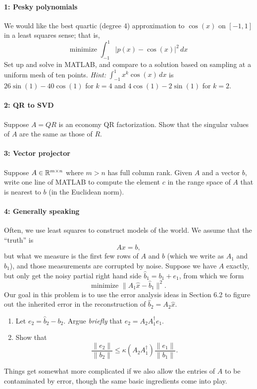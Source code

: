 \documentclass[12pt, leqno]{article}
\begin{document}

\paragraph*{1: Pesky polynomials}
We would like the best quartic (degree 4) approximation to $\cos(x)$
on $[-1,1]$ in a least squares sense; that is,
\[
  \mbox{minimize } \int_{-1}^1 |p(x)-\cos(x)|^2 \, dx
\]
Set up and solve in MATLAB, and compare to a solution based on
sampling at a uniform mesh of ten points.
{\em Hint:} $\int_{-1}^1 x^k \cos(x) \, dx$ is $26 \sin(1)-40 \cos(1)$
for $k = 4$ and $4 \cos(1) - 2 \sin(1)$ for $k = 2$.

\paragraph*{2: QR to SVD}
Suppose $A = QR$ is an economy QR factorization.  Show that the
singular values of $A$ are the same as those of $R$.

\paragraph*{3: Vector projector}
Suppose $A \in \mathbb{R}^{m \times n}$ where $m > n$ has full column rank.
Given $A$ and a vector $b$, write one line of MATLAB to compute the
element $c$ in the range space of $A$ that is nearest to $b$
(in the Euclidean norm).

\paragraph*{4: Generally speaking}
Often, we use least squares to construct models of the world.  We
assume that the ``truth'' is
\[
  Ax = b,
\]
but what we measure is the first few rows of $A$ and $b$ (which we
write as $A_1$ and $b_1$), and those measurements are corrupted by
noise.  Suppose we have $A$ exactly, but only get the noisy
partial right hand side $\hat{b}_1 = b_1+e_1$, from which we form
\[
  \mbox{minimize } \|A_1 \hat{x} - \hat{b}_1\|^2.
\]
Our goal in this problem is to use the error analysis ideas in
Section 6.2 to figure out the inherited error in the reconstruction
of $\hat{b}_2 = A_2 \hat{x}$.
\begin{enumerate}
\item
  Let $e_2 = \hat{b}_2-b_2$.  Argue {\em briefly} that
  $e_2 = A_2 A_1^\dagger e_1$.
\item
  Show that
  \[
    \frac{\|e_2\|}{\|b_2\|} \leq \kappa(A_2 A_1^\dagger) \frac{\|e_1\|}{\|b_1\|}.
  \]
\end{enumerate}
Things get somewhat more complicated if we also allow the entries of
$A$ to be contaminated by error, though the same basic ingredients
come into play.
\end{document}

